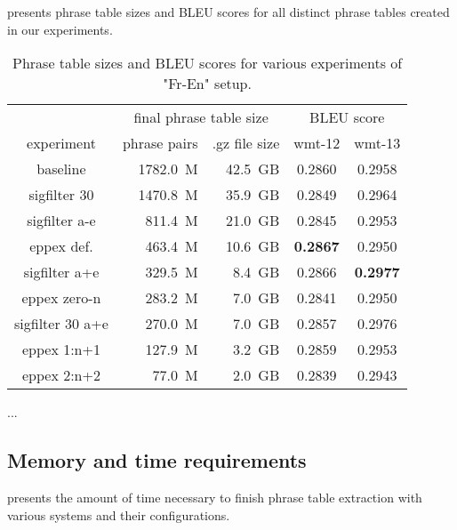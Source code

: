 presents phrase table sizes and BLEU scores for all
distinct phrase tables created in our experiments.

\begin{table}[ht]
\centering
\begin{tabular}{ | c | r r | c c | }
\hline
 & \multicolumn{2}{|c|}{final phrase table size} & \multicolumn{2}{|c|}{BLEU score} \\
experiment & phrase pairs & .gz file size & wmt-12 & wmt-13 \\
\hline
\hline
baseline          & 1782.0~M & 42.5~GB & 0.2860 & 0.2958 \\
sigfilter 30      & 1470.8~M & 35.9~GB & 0.2849 & 0.2964 \\
sigfilter a-e     &  811.4~M & 21.0~GB & 0.2845 & 0.2953 \\
eppex def.        &  463.4~M & 10.6~GB & \textbf{0.2867} & 0.2950 \\
sigfilter a+e     &  329.5~M &  8.4~GB & 0.2866 & \textbf{0.2977} \\
eppex zero-n      &  283.2~M &  7.0~GB & 0.2841 & 0.2950 \\
sigfilter 30 a+e  &  270.0~M &  7.0~GB & 0.2857 & 0.2976 \\
eppex 1:n+1       &  127.9~M &  3.2~GB & 0.2859 & 0.2953 \\
eppex 2:n+2       &   77.0~M &  2.0~GB & 0.2839 & 0.2943 \\
\hline
\end{tabular}
\caption{\label{fr-en-pt-size-and-bleu}
Phrase table sizes and BLEU scores for various experiments of "Fr-En" setup.}
\end{table}

...

\subsection{Memory and time requirements}

 presents the amount of time necessary to finish
phrase table extraction with various systems and their configurations.

